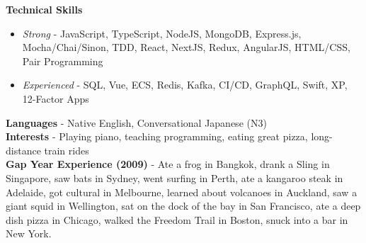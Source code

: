 
\begin{cvparagraph}

  \textbf{Technical Skills}
  \begin{itemize}[noitemsep, topsep=-0.6em, leftmargin=1.5em]
    \item {\textit{Strong} - JavaScript, TypeScript, NodeJS, MongoDB, Express.js, Mocha/Chai/Sinon, TDD, React, NextJS, Redux, AngularJS, HTML/CSS, Pair Programming}
    \item {\textit{Experienced} - SQL, Vue, ECS, Redis, Kafka, CI/CD, GraphQL, Swift, XP, 12-Factor Apps}
  \end{itemize}

  \textbf{Languages} - Native English, Conversational Japanese (N3) \\
  \textbf{Interests} - Playing piano, teaching programming, eating great pizza, long-distance train rides \\
  \textbf{Gap Year Experience (2009)} - Ate a frog in Bangkok, drank a Sling in Singapore, saw bats in Sydney, went surfing in Perth, ate a kangaroo steak in Adelaide, got cultural in Melbourne, learned about volcanoes in Auckland, saw a giant squid in Wellington, sat on the dock of the bay in San Francisco, ate a deep dish pizza in Chicago, walked the Freedom Trail in Boston, snuck into a bar in New York.

\end{cvparagraph}
